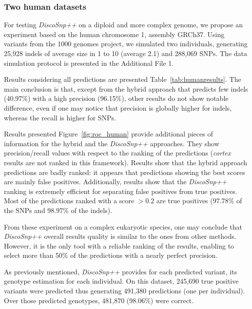 \documentclass{bmcart}
\newcommand{\discopp}{{\it DiscoSnp++}\xspace}
\newcommand{\co}{{\it cortex}\xspace}
\begin{document}
\subsubsection*{Two human datasets}
\label{ssec:twohumans}
For testing \discopp on a diploid and more complex genome, we propose an experiment based on the human chromosome 1, assembly GRCh37. Using variants from the 1000 genomes project, we simulated two individuals, generating 25,928 indels of average size in 1 to 10 (average 2.1) and 288,069 SNPs.
The data simulation protocol is presented in the Additional File 1. 

Results 
considering all predictions are presented Table~\ref{tab:humanresults}. 
The main conclusion is that, except from the hybrid approach that predicts few indels (40.97\%) with a high precision (96.15\%), other results do not show  notable difference, even if one may notice that precision is globally higher for indels, whereas the recall is higher for SNPs. 

Results presented Figure~\ref{fig:roc_human} provide additional pieces of information for the hybrid and the \discopp approaches. They show precision/recall values with respect to the ranking of the predictions (\co results are not ranked in this framework). Results show that the hybrid approach predictions are badly ranked: it appears that predictions showing the best scores are mainly false positives. Additionally, results show that the \discopp ranking is extremely efficient for separating false positives from true positives. Most of the predictions ranked with a score $>0.2$ are true positives (97.78\%  of the SNPs and 98.97\% of the indels). 

From these experiment on a complex eukaryotic species, one may conclude that \discopp overall results quality is similar to the ones from other methods. However, it is the only tool with a reliable ranking of the results, enabling to select more than 50\% of the predictions with a nearly perfect precision.

As previously mentioned, \discopp provides for each predicted variant, its genotype estimation for each individual. On this dataset, 245,690 true positive variants were predicted thus generating 491,380 predictions (one per individual). Over those predicted genotypes, 481,870 (98.06\%) were correct. 
\end{document}
